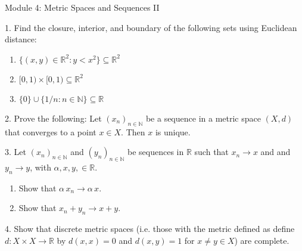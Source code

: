 \documentclass{article}
\theoremstyle{remark} %
\newcommand{\R}{{\mathbb{R}}}
\newcommand{\N}{{\mathbb{N}}}
\begin{document}
\begin{center}
\Large{Module 4: Metric Spaces and Sequences II}
\end{center}


1.  Find the closure, interior, and boundary of the following sets using Euclidean distance:
    \begin{enumerate}
        \item[(i)] $\{(x,y)\in \R^2 : y < x^2 \} \subseteq \R^2$
        \item[(ii)]  $[0,1)\times[0,1) \subseteq \R^2$
        \item[(iii)] $\{0 \} \cup  \{1/n \colon n \in \N\} \subseteq \R$ 
    \end{enumerate}

\vspace{10cm} %




2. Prove the following: Let $(x_n)_{n\in\N}$ be a sequence in a metric space $(X,d)$ that converges to a point $x \in X$. Then $x$ is unique.

\vspace{11cm} %



3. Let $(x_n)_{n \in \N}$ and $(y_n)_{n \in \N}$ be sequences in $\R$ such that $x_n \to x$ and and $y_n \to y$, with $\alpha, x,y, \in \R$. 
    \begin{enumerate}
        \item[(i)] Show that $\alpha \, x_n \to \alpha \, x$.
        \item[(i)] Show that $x_n + y_n \to x + y$.
    \end{enumerate}

\vspace{11cm} %




4. Show that discrete metric spaces (i.e. those with the metric defined as define $d\colon X \times X \to \R$ by $d(x,x) = 0$ and $d(x,y)=1$ for $x\neq y \in X$) are complete. 
\vspace{11cm} %
\end{document}
